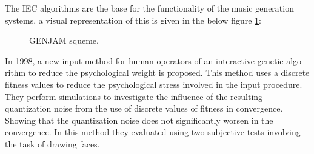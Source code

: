 The IEC algorithms are the base for the functionality of the music generation
systems, a visual representation of this is given in the below figure \ref{fig:GENJAM}:

\begin{figure}
\captionsetup{justification=centering,margin=2cm}
\centering
\setlength\fboxsep{0pt}
\setlength\fboxrule{0.7pt}
\caption{GENJAM squeme.}
\label{fig:GENJAM}       
\end{figure}

In 1998, a new input method for human operators of an interactive genetic algo-
rithm to reduce the psychological weight is proposed. This method uses a
discrete fitness values to reduce the psychological stress involved in the input
procedure. They perform simulations to investigate the influence of the
resulting quantization noise from the use of discrete values of fitness in
convergence. Showing that the quantization noise does not significantly worsen
in the convergence. In this method they evaluated using two subjective tests
involving the task of drawing faces.

